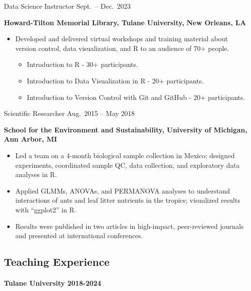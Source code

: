 \documentclass[
  letterpaper,
  DIV=11,
  numbers=noendperiod]{scrartcl}
\let\oldparagraph\paragraph
\renewcommand{\paragraph}[1]{\oldparagraph{#1}\mbox{}}
\providecommand{\tightlist}{%
  \setlength{\itemsep}{0pt}\setlength{\parskip}{0pt}}\usepackage{longtable,booktabs,array}
\begin{document}
{Data Science Instructor} {Sept.~-- Dec.~2023}

\textbf{Howard-Tilton Memorial Library, Tulane University, New Orleans,
LA}

\begin{itemize}
\tightlist
\item
  Developed and delivered virtual workshops and training material about
  version control, data visualization, and R to an audience of 70+
  people.

  \begin{itemize}
  \tightlist
  \item
    Introduction to R - 30+ participants.
  \item
    Introduction to Data Visualization in R - 20+ participants.
  \item
    Introduction to Version Control with Git and GitHub - 20+
    participants.
  \end{itemize}
\end{itemize}

{Scientific Researcher} {Aug.~2015 -- May 2018}

\textbf{School for the Environment and Sustainability, University of
Michigan, Ann Arbor, MI}

\begin{itemize}
\tightlist
\item
  Led a team on a 4-month biological sample collection in Mexico;
  designed experiments, coordinated sample QC, data collection, and
  exploratory data analyses in R.
\item
  Applied GLMMs, ANOVAs, and PERMANOVA analyses to understand
  interactions of ants and leaf litter nutrients in the tropics;
  visualized results with ``ggplot2'' in R.
\item
  Results were published in two articles in high-impact, peer-reviewed
  journals and presented at international conferences.
\end{itemize}

\subsection{\texorpdfstring{ Teaching
Experience}{ Teaching Experience}}\label{teaching-experience}

\paragraph{\texorpdfstring{Tulane University
{2018-2024}}{Tulane University 2018-2024}}\label{tulane-university-2018-2024}
\end{document}

